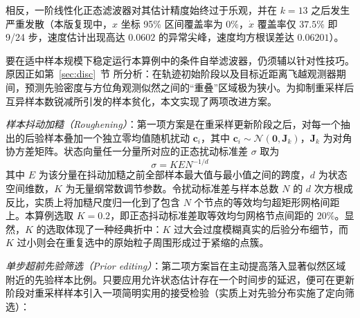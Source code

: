

相反，一阶线性化正态滤波器对其估计精度始终过于乐观，并在 $k = 13$ 之后发生严重发散（本版复现中，$x$ 坐标 95\% 区间覆盖率为 $0\%$，$\dot{x}$ 覆盖率仅 $37.5\%$ 即 9/24 步，速度估计出现高达 $0.0602$ 的异常尖峰，速度均方根误差达 $0.06201$）。



要在适中样本规模下稳定运行本算例中的条件自举滤波器，仍须辅以针对性技巧。原因正如第~\ref{sec:disc}~节 所分析：在轨迹初始阶段以及目标近距离飞越观测器期间，预测先验密度与方位角观测似然之间的“重叠”区域极为狭小。为抑制重采样后互异样本数锐减所引发的样本贫化，本文实现了两项改进方案。

\emph{样本抖动加糙（Roughening）}：第一项方案是在重采样更新阶段之后，对每一个抽出的后验样本叠加一个独立零均值随机扰动 $\bm{c}_i$，其中 $\bm{c}_i \sim \mathcal{N}(\bm{0}, \bm{J}_k)$，$\bm{J}_k$ 为对角协方差矩阵。状态向量任一分量所对应的正态扰动标准差 $\sigma$ 取为
\begin{equation*}
\sigma = K E N^{-1/d}
\end{equation*}
其中 $E$ 为该分量在抖动加糙之前全部样本最大值与最小值之间的跨度，$d$ 为状态空间维数，$K$ 为无量纲常数调节参数。令扰动标准差与样本总数 $N$ 的 $d$ 次方根成反比，实质上将加糙尺度归一化到了包含 $N$ 个节点的等效均匀超矩形网格间距上。本算例选取 $K = 0.2$，即正态抖动标准差取等效均匀网格节点间距的 $20\%$。显然，$K$ 的选取体现了一种经典折中：$K$ 过大会过度模糊真实的后验分布细节，而 $K$ 过小则会在重复选中的原始粒子周围形成过于紧缩的点簇。

\emph{单步超前先验筛选（Prior editing）}：第二项方案旨在主动提高落入显著似然区域附近的先验样本比例。只要应用允许状态估计存在一个时间步的延迟，便可在更新阶段对重采样样本引入一项简明实用的接受检验（实质上对先验分布实施了定向筛选）：

